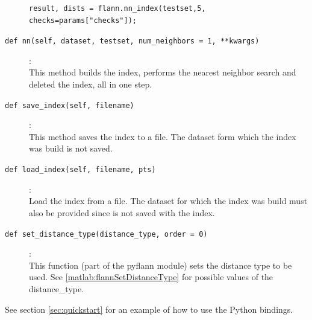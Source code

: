\documentclass[letter,10pt]{article}
\begin{document}
\begin{description}
\begin{Verbatim}[fontsize=\scriptsize,frame=single]
result, dists = flann.nn_index(testset,5, checks=params["checks"]);
\end{Verbatim}

\item[\texttt{def nn(self, dataset, testset, num\_neighbors = 1, **kwargs)}]:\\
    This method builds the index, performs the nearest neighbor search and
deleted the index, all in one step.

\item [\texttt{def save\_index(self, filename)}] :\\
    This method saves the index to a file. The dataset form which the index was
build is not saved.

\item [\texttt{def load\_index(self, filename, pts)}] :\\
    Load the index from a file. The dataset for which the index was build must also 
be provided since is not saved with the index.

\item [\texttt{def set\_distance\_type(distance\_type, order = 0)}] :\\
    This function (part of the pyflann module) sets the distance type to be used. See
\ref{matlab:flannSetDistanceType} for possible values of the distance\_type.

\end{description}



See section \ref{sec:quickstart} for an example of how to use the Python
bindings.




\end{document}
